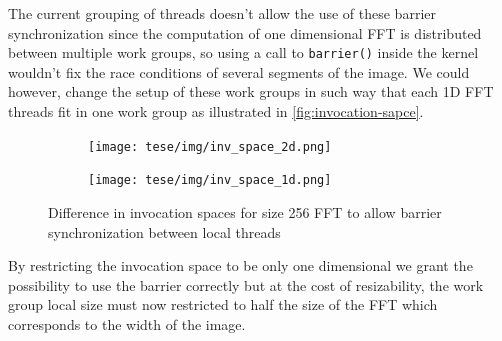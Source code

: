\documentclass[
  oneside,
  11pt, a4paper,
  footinclude=true,
  headinclude=true,
  cleardoublepage=empty
]{scrbook}
\begin{document}
The current grouping of threads doesn't allow the use of these barrier synchronization since the computation of one dimensional FFT is distributed between multiple work groups, so using a call to \texttt{barrier()} inside the kernel wouldn't fix the race conditions of several segments of the image. We could however, change the setup of these work groups in such way that each 1D FFT threads fit in one work group as illustrated in \autoref{fig:invocation-sapce}. 


\begin{figure}[h] 
    \begin{subfigure}{.5\textwidth}
        \centering
        \texttt{[image: tese/img/inv\_space\_2d.png]}
    \end{subfigure}
    \begin{subfigure}{.5\textwidth}
        \centering
        \texttt{[image: tese/img/inv\_space\_1d.png]}
    \end{subfigure}
    \caption{Difference in invocation spaces for size 256 FFT to allow barrier synchronization between local threads}
    \label{fig:invocation-sapce}
\end{figure}

By restricting the invocation space to be only one dimensional we grant the possibility to use the barrier correctly but at the cost of resizability, the work group local size must now restricted to half the size of the FFT which corresponds to the width of the image.


\end{document}
